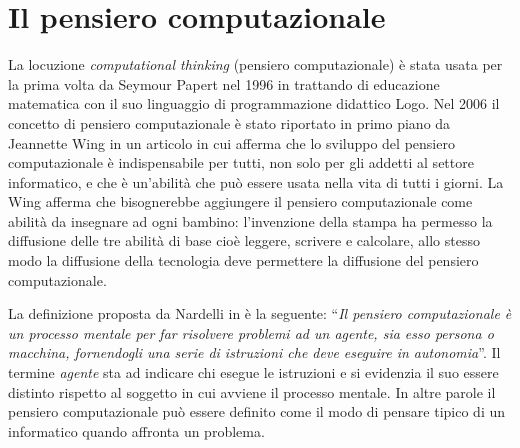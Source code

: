 \documentclass[12pt]{report}
\begin{document}
\section{Il pensiero computazionale}
La locuzione \textit{computational thinking} (pensiero computazionale) è stata usata per la prima volta da Seymour Papert nel 1996 in \cite{PapertCT} trattando di educazione matematica con il suo linguaggio di programmazione didattico Logo. 
Nel 2006 il concetto di pensiero computazionale è stato riportato in primo piano da Jeannette Wing in un articolo \cite{WingCT2006} in cui afferma che lo sviluppo del pensiero computazionale è indispensabile per tutti, non solo per gli addetti al settore informatico, e che è un'abilità che può essere usata nella vita di tutti i giorni. La Wing afferma che bisognerebbe aggiungere il pensiero computazionale come abilità da insegnare ad ogni bambino: l'invenzione della stampa ha permesso la diffusione delle tre abilità di base cioè leggere, scrivere e calcolare, allo stesso modo la diffusione della tecnologia deve permettere la diffusione del pensiero computazionale.


La definizione proposta da Nardelli in \cite{NardelliCT} è la seguente:
``\textit{Il pensiero computazionale è un processo mentale per far risolvere problemi ad un agente, sia esso persona o macchina, fornendogli una serie di istruzioni che deve eseguire in autonomia}''.
Il termine \textit{agente} sta ad indicare chi esegue le istruzioni e si evidenzia il suo essere distinto rispetto al soggetto in cui avviene il processo mentale.
In altre parole il pensiero computazionale può essere definito come il modo di pensare tipico di un informatico quando affronta un problema.
\end{document}
